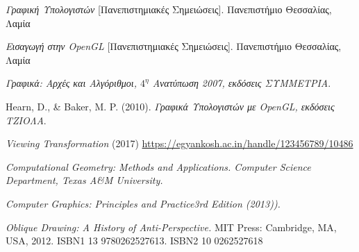 \begin{thebibliography}{7}

 \emph{Γραφική Υπολογιστών} [Πανεπιστημιακές Σημειώσεις]. Πανεπιστήμιο Θεσσαλίας, Λαμία

 \emph{Εισαγωγή στην \textlatin{OpenGL}} [Πανεπιστημιακές Σημειώσεις]. Πανεπιστήμιο Θεσσαλίας, Λαμία

 \emph{Γραφικά: Αρχές και Αλγόριθμοι, $4^η$ Ανατύπωση 2007, εκδόσεις ΣΥΜΜΕΤΡΙΑ}.

 \textlatin{Hearn, D., \& Baker, M. P. (2010)}. \emph{Γραφικά Υπολογιστών με \textlatin{OpenGL}, εκδόσεις ΤΖΙΟΛΑ}.


 \emph{Viewing Transformation} (2017) {\url{https://egyankosh.ac.in/handle/123456789/10486}}

 \emph{Computational Geometry: Methods and Applications. Computer Science Department, Texas A\&M University.}

 \emph{Computer Graphics: Principles and Practice3rd Edition (2013)).}

 \emph{Oblique Drawing: A History of Anti-Perspective.} MIT Press: Cambridge, MA, USA, 2012. ISBN1 13 9780262527613. ISBN2 10 0262527618

\end{thebibliography}
